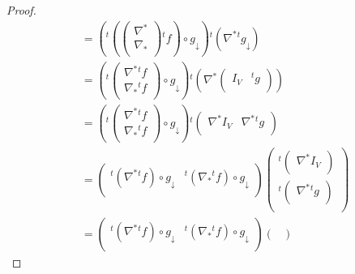 \documentclass[dvipdfmx]{jsarticle}
\begin{document}
\begin{proof}
\begin{align*}
&= \left({}^{t}\left( \begin{pmatrix}
\nabla^{*} \\
\nabla_{*} \\
\end{pmatrix}{}^{t}f \right) \circ g_{\downarrow} \right){}^{t}\left( \nabla^{*}{}^{t}g_{\downarrow} \right)\\
&= \left({}^{t}\begin{pmatrix}
\nabla^{*}{}^{t}f \\
\nabla_{*}{}^{t}f \\
\end{pmatrix} \circ g_{\downarrow} \right){}^{t}\left( \nabla^{*}\begin{pmatrix}
I_{V} & {}^{t}g \\
\end{pmatrix} \right)\\
&= \left({}^{t}\begin{pmatrix}
\nabla^{*}{}^{t}f \\
\nabla_{*}{}^{t}f \\
\end{pmatrix} \circ g_{\downarrow} \right){}^{t}\begin{pmatrix}
\nabla^{*}I_{V} & \nabla^{*}{}^{t}g \\
\end{pmatrix}\\
&= \begin{pmatrix}
{}^{t}\left( \nabla^{*}{}^{t}f \right) \circ g_{\downarrow} &{}^{t}\left( \nabla_{*}{}^{t}f \right) \circ g_{\downarrow} \\
\end{pmatrix}\begin{pmatrix}
{}^{t}\begin{pmatrix}
\nabla^{*}I_{V} \\
\end{pmatrix} \\
{}^{t}\begin{pmatrix}
\nabla^{*}{}^{t}g \\
\end{pmatrix} \\
\end{pmatrix}\\
&= \begin{pmatrix}
{}^{t}\left( \nabla^{*}{}^{t}f \right) \circ g_{\downarrow} &{}^{t}\left( \nabla_{*}{}^{t}f \right) \circ g_{\downarrow} \\
\end{pmatrix}\begin{pmatrix}

\end{pmatrix}
\end{align*}
\end{proof}
\end{document}
